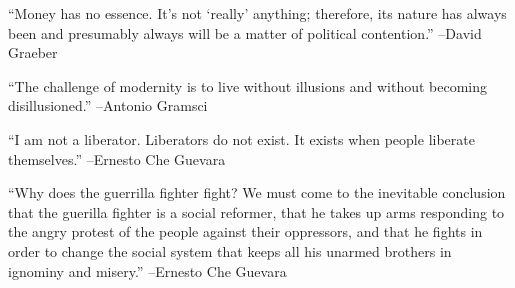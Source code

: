 \documentclass{article}%
\begin{document}
\linebreak%
\vspace{1mm}%
\begin{minipage}{\textwidth}%
\flushleft%
“Money has no essence. It's not ‘really’ anything; therefore, its nature has always been and presumably always will be a matter of political contention.”%
\linebreak%
\vspace{1mm}%
–David Graeber%
\linebreak%
\vspace{1mm}%
\end{minipage}%
\linebreak%
\vspace{1mm}%
\begin{minipage}{\textwidth}%
\flushleft%
“The challenge of modernity is to live without illusions and without becoming disillusioned.”%
\linebreak%
\vspace{1mm}%
–Antonio Gramsci%
\linebreak%
\vspace{1mm}%
\end{minipage}%
\linebreak%
\vspace{1mm}%
\begin{minipage}{\textwidth}%
\flushleft%
“I am not a liberator. Liberators do not exist. It exists when people liberate themselves.”%
\linebreak%
\vspace{1mm}%
–Ernesto Che Guevara%
\linebreak%
\vspace{1mm}%
\end{minipage}%
\linebreak%
\vspace{1mm}%
\begin{minipage}{\textwidth}%
\flushleft%
“Why does the guerrilla fighter fight? We must come to the inevitable conclusion that the guerilla fighter is a social reformer, that he takes up arms responding to the angry protest of the people against their oppressors, and that he fights in order to change the social system that keeps all his unarmed brothers in ignominy and misery.”%
\linebreak%
\vspace{1mm}%
–Ernesto Che Guevara%
\linebreak%
\vspace{1mm}%
\end{minipage}%
\linebreak%
\end{document}
